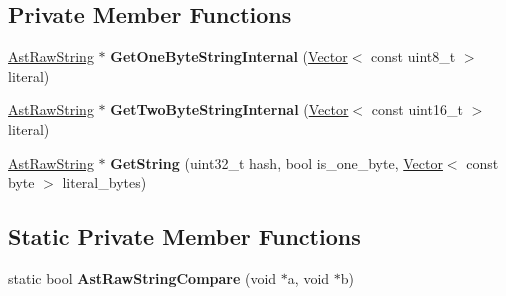 \subsection*{Private Member Functions}
\begin{DoxyCompactItemize}
\item 
\hyperlink{classv8_1_1internal_1_1_ast_raw_string}{Ast\+Raw\+String} $\ast$ {\bfseries Get\+One\+Byte\+String\+Internal} (\hyperlink{classv8_1_1internal_1_1_vector}{Vector}$<$ const uint8\+\_\+t $>$ literal)\hypertarget{classv8_1_1internal_1_1_ast_value_factory_aefd7d6f1e83885af83f7ec1e91034643}{}\label{classv8_1_1internal_1_1_ast_value_factory_aefd7d6f1e83885af83f7ec1e91034643}

\item 
\hyperlink{classv8_1_1internal_1_1_ast_raw_string}{Ast\+Raw\+String} $\ast$ {\bfseries Get\+Two\+Byte\+String\+Internal} (\hyperlink{classv8_1_1internal_1_1_vector}{Vector}$<$ const uint16\+\_\+t $>$ literal)\hypertarget{classv8_1_1internal_1_1_ast_value_factory_ae0b225955a8c899efa5a9e70ca7c6b7d}{}\label{classv8_1_1internal_1_1_ast_value_factory_ae0b225955a8c899efa5a9e70ca7c6b7d}

\item 
\hyperlink{classv8_1_1internal_1_1_ast_raw_string}{Ast\+Raw\+String} $\ast$ {\bfseries Get\+String} (uint32\+\_\+t hash, bool is\+\_\+one\+\_\+byte, \hyperlink{classv8_1_1internal_1_1_vector}{Vector}$<$ const byte $>$ literal\+\_\+bytes)\hypertarget{classv8_1_1internal_1_1_ast_value_factory_a1b393855278e1ad6acbb6d18052f056a}{}\label{classv8_1_1internal_1_1_ast_value_factory_a1b393855278e1ad6acbb6d18052f056a}

\end{DoxyCompactItemize}
\subsection*{Static Private Member Functions}
\begin{DoxyCompactItemize}
\item 
static bool {\bfseries Ast\+Raw\+String\+Compare} (void $\ast$a, void $\ast$b)\hypertarget{classv8_1_1internal_1_1_ast_value_factory_ab19b537fb49474dc71c24dd161552978}{}\label{classv8_1_1internal_1_1_ast_value_factory_ab19b537fb49474dc71c24dd161552978}

\end{DoxyCompactItemize}
